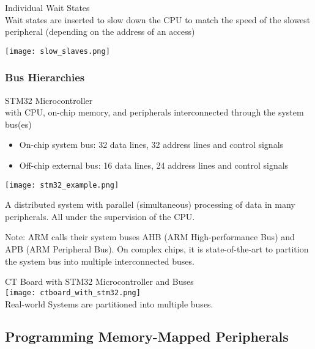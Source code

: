 \begin{KR}{Individual Wait States}\\
    Wait states are inserted to slow down the CPU to match the speed of the slowest peripheral (depending on the address of an access)

    \texttt{[image: slow\_slaves.png]}    
\end{KR}

\subsubsection{Bus Hierarchies}

\begin{example2}{STM32 Microcontroller}\\
    with CPU, on-chip memory, and peripherals interconnected through the system bus(es)
    \begin{itemize}
        \item On-chip system bus: 32 data lines, 32 address lines and control signals
        \item Off-chip external bus: 16 data lines, 24 address lines and control signals
    \end{itemize}
    \texttt{[image: stm32\_example.png]}

    A distributed system with parallel (simultaneous) processing of data in many peripherals. All under the supervision of the CPU.
\end{example2}

\begin{remark}
    Note: ARM calls their system buses AHB (ARM High-performance Bus) and APB (ARM
    Peripheral Bus). On complex chips, it is state-of-the-art to partition the system bus into
    multiple interconnected buses.
\end{remark}

\begin{example2}{CT Board with STM32 Microcontroller and Buses}\\
    \texttt{[image: ctboard\_with\_stm32.png]}\\
    Real-world Systems are partitioned into multiple buses.
\end{example2}

\subsection{Programming Memory-Mapped Peripherals}

